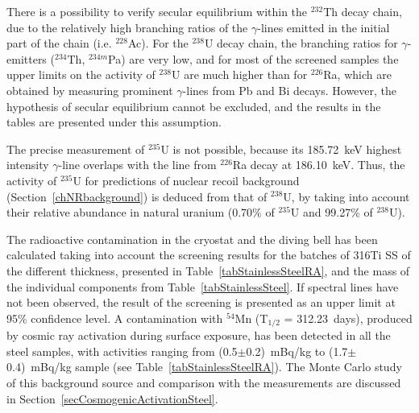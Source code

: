 There is a possibility to verify secular equilibrium within the $^{232}$Th decay chain, due to the relatively high branching ratios of the $\gamma$-lines emitted in the initial part of the chain (i.e. $^{228}$Ac). For the $^{238}$U decay chain, the branching ratios for $\gamma$-emitters ($^{234}$Th, $^{234m}$Pa) are very low, and for most of the screened samples the upper limits on the activity of $^{238}$U are much higher than for $^{226}$Ra, which are obtained by measuring prominent $\gamma$-lines from Pb and Bi decays.  However, the hypothesis of secular equilibrium cannot be excluded, and the results in the tables are presented under this assumption.

The precise measurement of $^{235}$U is not possible, because its 185.72~keV highest intensity $\gamma$-line overlaps with the line from $^{226}$Ra decay at 186.10~keV. Thus, the activity of $^{235}$U for predictions of nuclear recoil background (Section~\ref{chNRbackground}) is deduced from that of $^{238}$U, by taking into account their relative abundance in natural uranium (0.70\% of $^{235}$U and 99.27\% of $^{238}$U). 

The radioactive contamination in the cryostat and the diving bell  has been calculated taking into account the screening results for the batches of 316Ti SS of the different thickness, presented in Table~\ref{tabStainlessSteelRA}, and the mass of the individual components from Table~\ref{tabStainlessSteel}. If spectral lines have not been observed, the result of the screening is presented as an upper limit at 95\% confidence level.
A contamination with $^{54}$Mn (T$_{1/2}$ = 312.23~days), produced by cosmic ray activation during surface exposure, has been detected in all the steel samples, with activities ranging from (0.5$\pm$0.2)~mBq/kg to (1.7$\pm$0.4)~mBq/kg sample (see Table~\ref{tabStainlessSteelRA}). The Monte Carlo study of this background source and comparison with the measurements are discussed in Section~\ref{secCosmogenicActivationSteel}.

